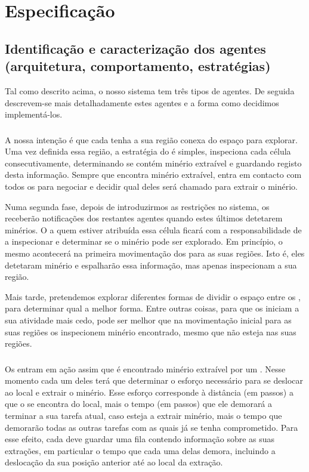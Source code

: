 \documentclass[12pt]{report}
\begin{document}
\chapter{Especificação}

\section{Identificação e caracterização dos agentes (arquitetura, comportamento, estratégias)}
Tal como descrito acima, o nosso sistema tem três tipos de agentes. De seguida descrevem-se mais detalhadamente estes agentes e a forma como decidimos implementá-los.

\subsection{\Spotter}
A nossa intenção é que cada \spotter tenha a sua região conexa do espaço para explorar. Uma vez definida essa região, a estratégia do \Spotter é simples, inspeciona cada célula consecutivamente, determinando se contém minério extraível e guardando registo desta informação. Sempre que encontra minério extraível, entra em contacto com todos os \producers para negociar e decidir qual deles será chamado para extrair o minério.

Numa segunda fase, depois de introduzirmos as restrições no sistema, os \spotters receberão notificações dos restantes agentes quando estes últimos detetarem minérios. O \spotter a quem estiver atribuída essa célula ficará com a responsabilidade de a inspecionar e determinar se o minério pode ser explorado. Em princípio, o mesmo acontecerá na primeira movimentação dos \spotters para as suas regiões. Isto é, eles detetaram minério e espalharão essa informação, mas apenas inspecionam a sua região.

Mais tarde, pretendemos explorar diferentes formas de dividir o espaço entre os \spotters, para determinar qual a melhor forma. Entre outras coisas, para que os \producers iniciam a sua atividade mais cedo, pode ser melhor que na movimentação inicial para as suas regiões os \spotters inspecionem minério encontrado, mesmo que não esteja nas suas regiões.

\subsection{\Producer}
Os \producers entram em ação assim que é encontrado minério extraível por um \spotter. Nesse momento cada um deles terá que determinar o esforço necessário para se deslocar ao local e extrair o minério. Esse esforço corresponde à distância (em passos) a que o \producer se encontra do local, mais o tempo (em passos) que ele demorará a terminar a sua tarefa atual, caso esteja a extrair minério, mais o tempo que demorarão todas as outras tarefas com as quais já se tenha comprometido. Para esse efeito, cada \producer deve guardar uma fila contendo informação sobre as suas extrações, em particular o tempo que cada uma delas demora, incluindo a deslocação da sua posição anterior até ao local da extração.
\end{document}
